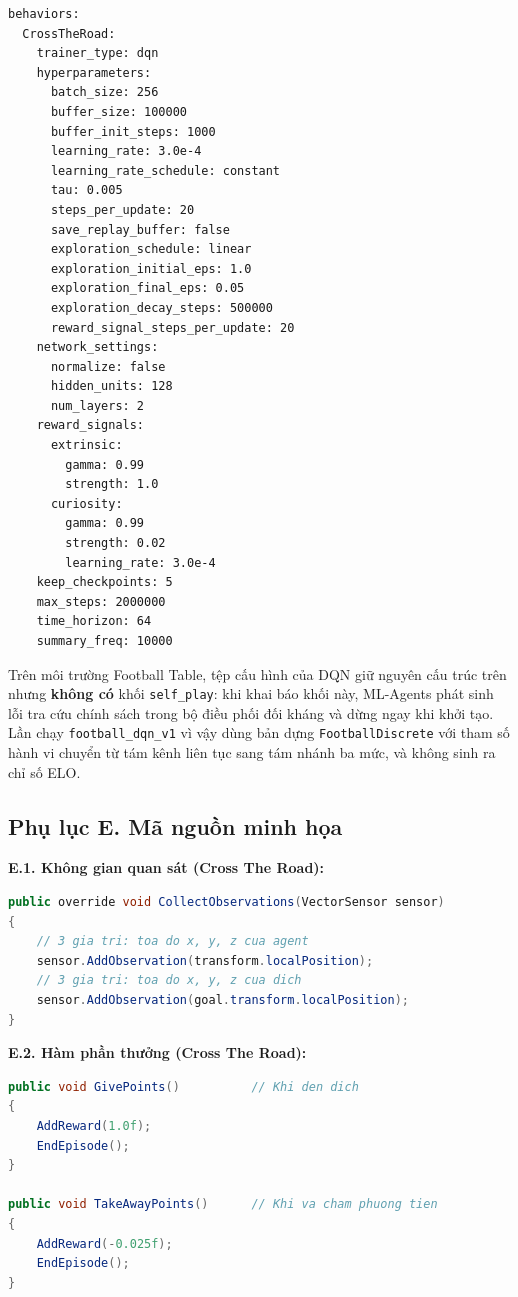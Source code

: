 \begin{lstlisting}[basicstyle=\ttfamily\scriptsize,caption={ctr\_dqn.yaml},captionpos=b]
behaviors:
  CrossTheRoad:
    trainer_type: dqn
    hyperparameters:
      batch_size: 256
      buffer_size: 100000
      buffer_init_steps: 1000
      learning_rate: 3.0e-4
      learning_rate_schedule: constant
      tau: 0.005
      steps_per_update: 20
      save_replay_buffer: false
      exploration_schedule: linear
      exploration_initial_eps: 1.0
      exploration_final_eps: 0.05
      exploration_decay_steps: 500000
      reward_signal_steps_per_update: 20
    network_settings:
      normalize: false
      hidden_units: 128
      num_layers: 2
    reward_signals:
      extrinsic:
        gamma: 0.99
        strength: 1.0
      curiosity:
        gamma: 0.99
        strength: 0.02
        learning_rate: 3.0e-4
    keep_checkpoints: 5
    max_steps: 2000000
    time_horizon: 64
    summary_freq: 10000
\end{lstlisting}

Trên môi trường Football Table, tệp cấu hình của DQN giữ nguyên cấu trúc trên nhưng
\textbf{không có} khối \texttt{self\_play}: khi khai báo khối này, ML-Agents phát sinh
lỗi tra cứu chính sách trong bộ điều phối đối kháng và dừng ngay khi khởi tạo. Lần chạy
\texttt{football\_dqn\_v1} vì vậy dùng bản dựng \texttt{FootballDiscrete} với tham số
hành vi chuyển từ tám kênh liên tục sang tám nhánh ba mức, và không sinh ra chỉ số ELO.

\subsection*{Phụ lục E. Mã nguồn minh họa}

\noindent\textbf{E.1. Không gian quan sát (Cross The Road):}
\begin{lstlisting}[language=Java,caption={CollectObservations - CrossTheRoadAgent.cs},captionpos=b]
public override void CollectObservations(VectorSensor sensor)
{
    // 3 gia tri: toa do x, y, z cua agent
    sensor.AddObservation(transform.localPosition);
    // 3 gia tri: toa do x, y, z cua dich
    sensor.AddObservation(goal.transform.localPosition);
}
\end{lstlisting}

\noindent\textbf{E.2. Hàm phần thưởng (Cross The Road):}
\begin{lstlisting}[language=Java,caption={GivePoints / TakeAwayPoints - CrossTheRoadAgent.cs},captionpos=b]
public void GivePoints()          // Khi den dich
{
    AddReward(1.0f);
    EndEpisode();
}

public void TakeAwayPoints()      // Khi va cham phuong tien
{
    AddReward(-0.025f);
    EndEpisode();
}
\end{lstlisting}

